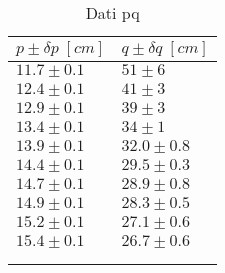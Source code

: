 \begin{longtable}[]{@{}ll@{}}
   \toprule
   $p \pm \delta p \; [cm]$ & $q \pm \delta q \; [cm]$ \tabularnewline
   \midrule
   \endhead
   $11.7 \pm 0.1$ & $51 \pm 6$ \tabularnewline
   $12.4 \pm 0.1$ & $41 \pm 3$ \tabularnewline
   $12.9 \pm 0.1$ & $39 \pm 3$ \tabularnewline
   $13.4 \pm 0.1$ & $34 \pm 1$ \tabularnewline
   $13.9 \pm 0.1$ & $32.0 \pm 0.8$ \tabularnewline
   $14.4 \pm 0.1$ & $29.5 \pm 0.3$ \tabularnewline
   $14.7 \pm 0.1$ & $28.9 \pm 0.8$ \tabularnewline
   $14.9 \pm 0.1$ & $28.3 \pm 0.5$ \tabularnewline
   $15.2 \pm 0.1$ & $27.1 \pm 0.6$ \tabularnewline
   $15.4 \pm 0.1$ & $26.7 \pm 0.6$ \tabularnewline
   \bottomrule
   \label{tab:pq}
   \\
   \caption{Dati pq}
\end{longtable}